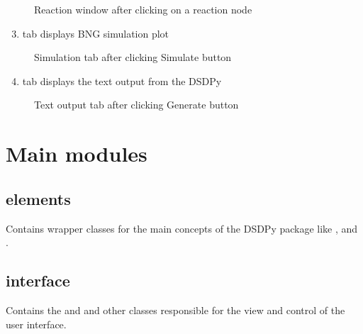 \documentclass[a4paper,12pt,oneside,english]{sphinxmanual}
\begin{document}
\begin{figure}[htbp]
\centering
\capstart

\noindent{}
\caption{Reaction window after clicking on a reaction node}\label{\detokenize{tutorial:id8}}\end{figure}
\begin{enumerate}
\setcounter{enumi}{2}
\item {} 
 tab displays BNG simulation plot

\end{enumerate}

\begin{figure}[htbp]
\centering
\capstart

\noindent{}
\caption{Simulation tab after clicking Simulate button}\label{\detokenize{tutorial:id9}}\end{figure}
\begin{enumerate}
\setcounter{enumi}{3}
\item {} 
 tab displays the text output from the DSDPy

\end{enumerate}

\begin{figure}[htbp]
\centering
\capstart

\noindent{}
\caption{Text output tab after clicking Generate button}\label{\detokenize{tutorial:id10}}\end{figure}


\chapter{Main modules}
\label{\detokenize{mainmodules::doc}}\label{\detokenize{mainmodules:main-modules}}

\section{elements}
\label{\detokenize{mainmodules:id1}}
Contains wrapper classes for the main concepts of the DSDPy package like ,  and  .


\section{interface}
\label{\detokenize{mainmodules:id2}}
Contains the  and  and other classes responsible for the view and control of the user interface.
\end{document}
